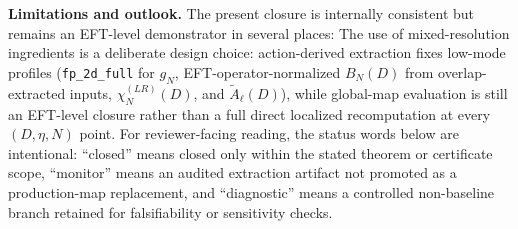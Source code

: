 \documentclass[aps,prd,onecolumn,notitlepage,nofootinbib,superscriptaddress,11pt,floatfix]{revtex4-2}
\begin{document}
\textbf{Limitations and outlook.}
The present closure is internally consistent but remains an EFT-level demonstrator in several places:
The use of mixed-resolution ingredients is a deliberate design choice: action-derived extraction fixes low-mode profiles (\texttt{fp\_2d\_full} for $g_N$, EFT-operator-normalized $B_N(D)$ from overlap-extracted inputs, $\chi_N^{(LR)}(D)$, and $\tilde A_\ell(D)$), while global-map evaluation is still an EFT-level closure rather than a full direct localized recomputation at every $(D,\eta,N)$ point.
For reviewer-facing reading, the status words below are intentional: ``closed'' means closed only within the stated theorem or certificate scope, ``monitor'' means an audited extraction artifact not promoted as a production-map replacement, and ``diagnostic'' means a controlled non-baseline branch retained for falsifiability or sensitivity checks.
\end{document}
